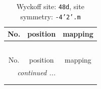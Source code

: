\documentclass[fleqn,8pt]{jsarticle}
\begin{document}
\renewcommand{\arraystretch}{1.2}
\begin{longtable}{ccc}
\caption{Wyckoff site: {\tt 48d}, site symmetry: {\tt -4'2'.m}}
 \\
 \hline \hline
No. & position & mapping \\ \hline \endfirsthead

\multicolumn{2}{l}{\tablename\ \thetable{}} \\
 \hline \hline
No. & position & mapping \\ \hline \endhead

 \hline \hline
\multicolumn{2}{r}{\footnotesize\it continued ...} \\ \endfoot

 \hline \hline
\multicolumn{2}{r}{} \\ \endlastfoot


\end{longtable}
\end{document}
